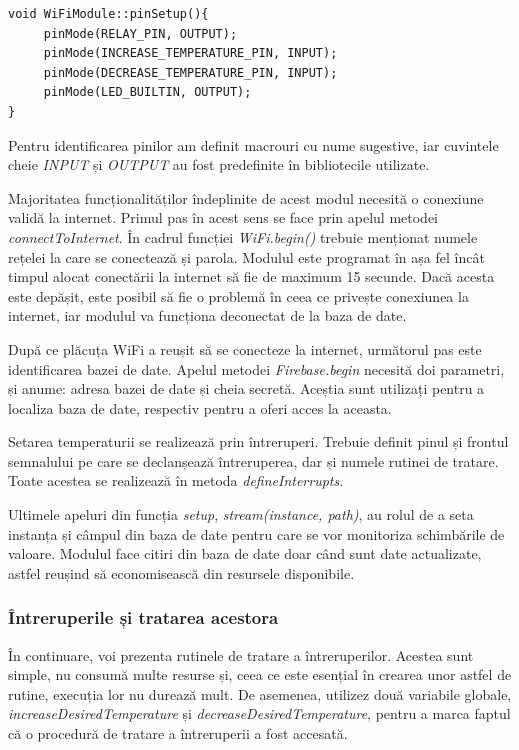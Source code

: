 \vspace{1em}

\begin{lstlisting}
void WiFiModule::pinSetup(){
     pinMode(RELAY_PIN, OUTPUT);
     pinMode(INCREASE_TEMPERATURE_PIN, INPUT);
     pinMode(DECREASE_TEMPERATURE_PIN, INPUT);
     pinMode(LED_BUILTIN, OUTPUT);
}
\end{lstlisting}

\vspace{2em}	

	Pentru identificarea pinilor am definit macrouri cu nume sugestive, iar cuvintele cheie \textit{INPUT} și \textit{OUTPUT} au fost predefinite în bibliotecile utilizate.

	Majoritatea funcționalităților îndeplinite de acest modul necesită o conexiune validă la internet. Primul pas în acest sens se face prin apelul metodei \textit{connectToInternet}. În cadrul funcției \textit{WiFi.begin()} trebuie menționat numele rețelei la care se conectează și parola. Modulul este programat în așa fel încât timpul alocat conectării la internet să fie de maximum 15 secunde. Dacă acesta este depășit, este posibil să fie o problemă în ceea ce privește conexiunea la internet, iar modulul va funcționa deconectat de la baza de date.
 
	După ce plăcuța WiFi a reușit să se conecteze la internet, următorul pas este identificarea bazei de date. Apelul metodei \textit{Firebase.begin} necesită doi parametri, și anume: adresa bazei de date și cheia secretă. Aceștia sunt utilizați pentru a localiza baza de date, respectiv pentru a oferi acces la aceasta.

	Setarea temperaturii se realizează prin întreruperi. Trebuie definit pinul și frontul semnalului pe care se declanșează întreruperea, dar și numele rutinei de tratare. Toate acestea se realizează în metoda \textit{defineInterrupts}.

	Ultimele apeluri din funcția \textit{setup}, \textit{stream(instance, path)}, au rolul de a seta instanța și câmpul din baza de date pentru care se vor monitoriza schimbările de valoare. Modulul face citiri din baza de date doar când sunt date actualizate, astfel reușind să economisească din resursele disponibile.

\subsubsection{Întreruperile și tratarea acestora}

	În continuare, voi prezenta rutinele de tratare a întreruperilor. Acestea sunt simple, nu consumă multe resurse și, ceea ce este esențial în crearea unor astfel de rutine, execuția lor nu durează mult. De asemenea, utilizez două variabile globale, \textit{increaseDesiredTemperature} și \textit{decreaseDesiredTemperature}, pentru a marca faptul că o procedură de tratare a întreruperii a fost accesată.

